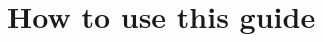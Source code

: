 \documentclass[11pt]{memoir}
\begin{document}








\section{How to use this guide}\label{sec:how}
\end{document}
